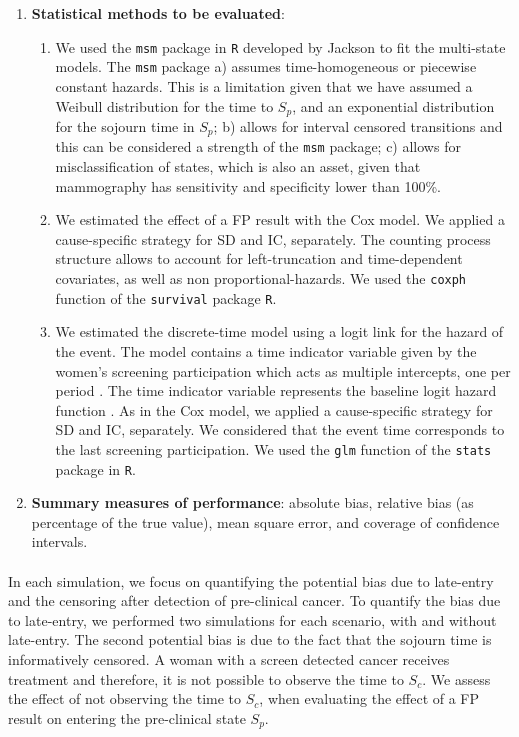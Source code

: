 \begin{enumerate}
\item \textbf{Statistical methods to be evaluated}:
\begin{enumerate}
\item We used the {\tt msm} package in {\tt R} developed by Jackson \cite{Jackson2011} to fit the multi-state models. The {\tt msm} package a) assumes time-homogeneous or piecewise constant hazards. This is a limitation given that we have assumed a Weibull distribution for the time to $S_p$, and an exponential distribution for the sojourn time in $S_p$; b) allows for interval censored transitions and this can be considered a strength of the {\tt msm} package; c) allows for misclassification of states, which is also an asset, given that mammography has sensitivity and specificity lower than 100\%.

\item We estimated the effect of a FP result with the Cox model. We applied a cause-specific strategy for SD and IC, separately. The counting process structure allows to account for left-truncation and time-dependent covariates, as well as non proportional-hazards. We used the {\tt coxph} function of the {\tt survival} package {\tt R}.

\item We estimated the discrete-time model using a logit link for the hazard of the event. The model contains a time indicator variable given by the women's screening participation which acts as multiple intercepts, one per period \cite{Roman2011b}. The time indicator variable represents the baseline logit hazard function \cite{Singer2003}. As in the Cox model, we applied a cause-specific strategy for SD and IC, separately. We considered that the event time corresponds to the last screening participation. We used the {\tt glm} function of the {\tt stats} package in {\tt R}.

\end{enumerate}

\item \textbf{Summary measures of performance}: absolute bias, relative bias (as percentage of the true value), mean square error, and coverage of confidence intervals.
 
 \end{enumerate}

\paragraph{}In each simulation, we focus on quantifying the potential bias due to late-entry and the censoring after detection of pre-clinical cancer. To quantify the bias due to late-entry, we performed two simulations for each scenario, with and without late-entry. The second potential bias is due to the fact that the sojourn time is informatively censored. A woman with a screen detected cancer receives treatment and therefore, it is not possible to observe the time to $S_c$. We assess the effect of not observing the time to $S_c$, when evaluating the effect of a FP result on entering the pre-clinical state $S_p$.

